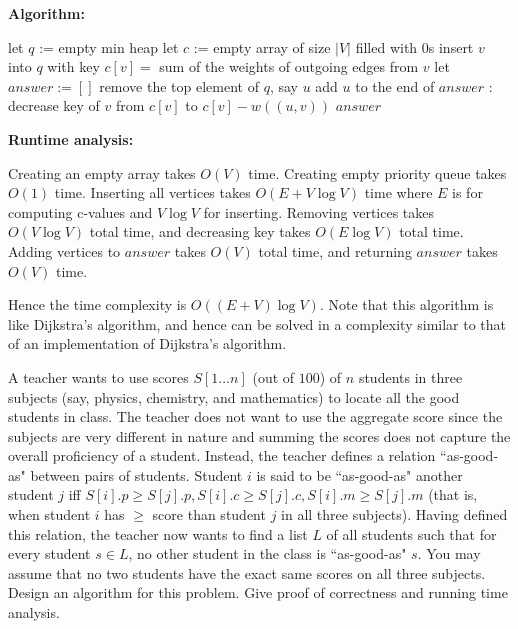 \documentclass[answers]{exam}
\begin{document}
\begin{questions}
\begin{solution}
    \textbf{Algorithm:}

    \begin{algorithmic}
            \State let $q$ := empty min heap
            \State let $c$ := empty array of size $|V|$ filled with $0$s
                \State insert $v$ into $q$ with key $c[v] =$ sum of the weights of outgoing edges from $v$
            \EndFor
            \State let $answer := []$
                \State remove the top element of $q$, say $u$
                \State add $u$ to the end of $answer$
                :
                    \State decrease key of $v$ from $c[v]$ to $c[v] - w((u, v))$
                \EndFor
            \EndWhile
            \State \Return $answer$
        \EndFunction
    \end{algorithmic}

\textbf{Runtime analysis:}

Creating an empty array takes $O(V)$ time. Creating empty priority queue takes $O(1)$ time. Inserting all vertices takes $O(E + V \log V)$ time where $E$ is for computing c-values and $V \log V$ for
inserting. Removing vertices takes $O(V \log V)$ total time, and decreasing key takes $O(E \log V)$ total time. Adding vertices to $answer$ takes $O(V)$ total time, and returning $answer$ takes
$O(V)$ time.

Hence the time complexity is $O((E + V) \log V)$. Note that this algorithm is like Dijkstra's algorithm, and hence can be solved in a complexity similar to that of an implementation of
Dijkstra's algorithm.
\end{solution}

\question[8]

A teacher wants to use scores $S[1 \dots n]$ (out of $100$) of $n$ students in three subjects (say, physics, chemistry, and mathematics) to locate all the good students in class. The teacher does not
want to use the aggregate score since the subjects are very different in nature and summing the scores does not capture the overall proficiency of a student. Instead, the teacher defines a relation
    ``as-good-as" between pairs of students. Student $i$ is said to be ``as-good-as" another student $j$ iff $S[i].p \geq S[j].p, S[i].c \geq S[j].c, S[i].m \geq S[j].m$ (that is, when student $i$ has
$\geq$ score than student $j$ in all three subjects). Having defined this relation, the teacher now wants to find a list $L$ of all students such that for every student $s \in L$, no other student in
the class is ``as-good-as" $s$. You may assume that no two students have the exact same scores on all three subjects. Design an algorithm for this problem. Give proof of correctness and running time analysis.


\end{questions}
\end{document}
